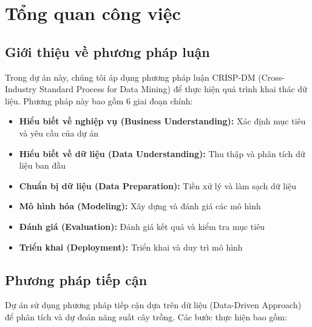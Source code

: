 \section{Tổng quan công việc}

\subsection{Giới thiệu về phương pháp luận}

\hspace{0.5cm}Trong dự án này, chúng tôi áp dụng phương pháp luận CRISP-DM (Cross-Industry Standard Process for Data Mining) để thực hiện quá trình khai thác dữ liệu. Phương pháp này bao gồm 6 giai đoạn chính:

\begin{itemize}
    \item \textbf{Hiểu biết về nghiệp vụ (Business Understanding):} Xác định mục tiêu và yêu cầu của dự án
    \item \textbf{Hiểu biết về dữ liệu (Data Understanding):} Thu thập và phân tích dữ liệu ban đầu
    \item \textbf{Chuẩn bị dữ liệu (Data Preparation):} Tiền xử lý và làm sạch dữ liệu
    \item \textbf{Mô hình hóa (Modeling):} Xây dựng và đánh giá các mô hình
    \item \textbf{Đánh giá (Evaluation):} Đánh giá kết quả và kiểm tra mục tiêu
    \item \textbf{Triển khai (Deployment):} Triển khai và duy trì mô hình
\end{itemize}

\subsection{Phương pháp tiếp cận}

\hspace{0.5cm}Dự án sử dụng phương pháp tiếp cận dựa trên dữ liệu (Data-Driven Approach) để phân tích và dự đoán năng suất cây trồng. Các bước thực hiện bao gồm:

